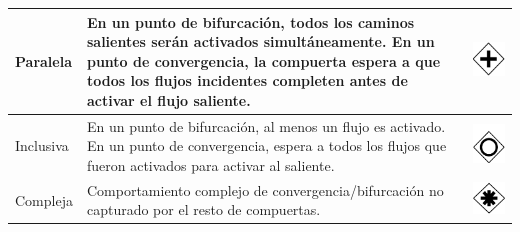 \begin{table}[H]
\begin{tabular}{|p{2cm}|p{9.5cm}|p{1.7cm} |}
		\hline
		{\small Paralela } & {\small En un punto de bifurcación, todos los caminos salientes serán activados simultáneamente. En un punto de convergencia, la compuerta espera a que todos los flujos incidentes completen antes de activar el flujo saliente.} & \vspace{0.5mm} \hspace{2mm} \includegraphics[scale=0.1]{Capitulo2/imagenes/gatewayP} \\
		\hline
		
		{\small Inclusiva } & {\small En un punto de bifurcación, al menos un flujo es activado. En un punto de convergencia, espera a todos los flujos que fueron activados para activar al saliente.} & \vspace{0.5mm} \hspace{2mm} \includegraphics[scale=0.1]{Capitulo2/imagenes/gatewayI} \\
		\hline

		{\small Compleja } & {\small Comportamiento complejo de convergencia/bifurcación no capturado por el resto de compuertas.} & \vspace{0.5mm} \hspace{2mm} \includegraphics[scale=0.1]{Capitulo2/imagenes/gatewayC} \\


\end{tabular}
\end{table}

